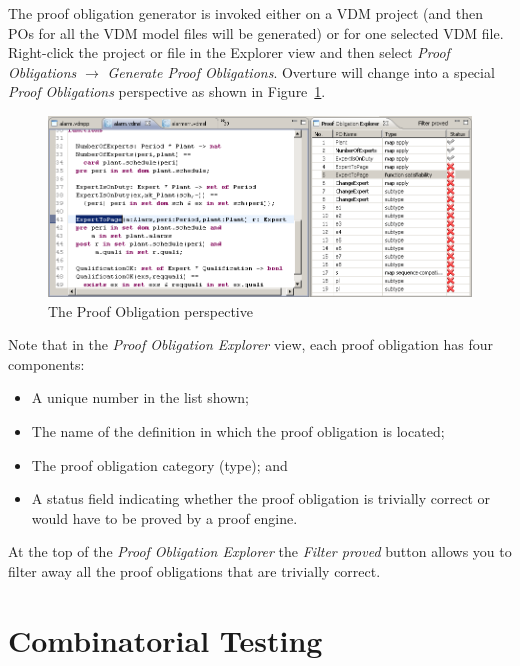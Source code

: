 \documentclass{overturerepchap}
\begin{document}
The proof obligation generator is invoked either on a VDM project (and
then POs for all the VDM model files will be generated) or for one
selected VDM file. Right-click the project or file in the Explorer view and
then select \emph{Proof Obligations} $\rightarrow$ \emph{Generate Proof
  Obligations}. Overture will change into a special
\emph{Proof Obligations} perspective as shown in
Figure~\ref{fig:POview}.  

\begin{figure}[htbp]
\begin{center}
\includegraphics[width=\textwidth]{figures/POview}
\caption{The Proof Obligation perspective\label{fig:POview}}
\end{center}
\end{figure}

Note that in the \emph{Proof Obligation Explorer} view, each proof
obligation has four components:
\begin{itemize}
\item A unique number in the list shown;
\item The name of the definition in which the proof obligation is
  located;
\item The proof obligation category (type); and
\item A status field indicating whether the proof obligation is
  trivially correct or would have to be proved by a proof engine.
\end{itemize}

At the top of the \emph{Proof Obligation Explorer} the \emph{Filter proved} button
allows you to filter away all the proof obligations that are trivially
correct. 

\chapter{Combinatorial Testing}\label{sec:testing}
\end{document}
